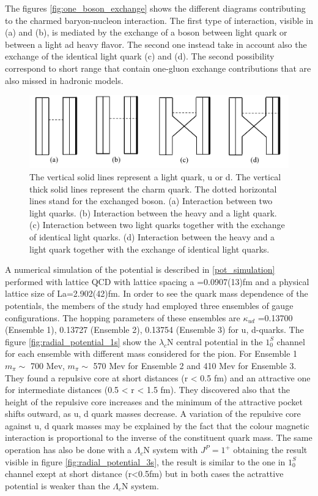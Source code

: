 \documentclass[12pt,a4paper]{book}
\begin{document}
	The figures \ref{fig:one_boson_exchange} shows the different diagrams contributing to the charmed baryon-nucleon interaction. The first type of interaction, visible in (a) and (b), is mediated by the exchange of a boson between light quark or between a light ad heavy flavor. The second one instead take in account also the exchange of the identical light quark (c) and (d). The second possibility correspond to short range that contain one-gluon exchange contributions that are also missed in hadronic models.
	
	\begin{figure}[ht]
		\centering
		\includegraphics[width=0.7\linewidth]{pictures/charmed_nucleos_interaction.png}
		\caption{ The vertical solid lines represent a light quark, u or d. The vertical thick solid lines represent the charm quark. The dotted horizontal lines stand for the exchanged boson. (a) Interaction between	two light quarks. (b) Interaction between the heavy and a light quark. (c) Interaction between	two light quarks together with the exchange of identical light quarks. (d) Interaction between the	heavy and a light quark together with the exchange of identical light quarks.}
		\label{fig:charmed_nucleos_interaction} 
	\end{figure}
	
	
	A numerical simulation of the potential is described in \ref{pot_simulation} performed with lattice QCD with lattice spacing a =0.0907(13)fm and a physical lattice size of La=2.902(42)fm. In order to see the quark mass dependence of the potentials, the members of the study had employed three ensembles of gauge configurations. The hopping parameters of these ensembles are $\kappa_{ud}$ =0.13700 (Ensemble 1), 0.13727 (Ensemble 2), 0.13754 (Ensemble 3) for u, d-quarks. The figure \ref{fig:radial_potential_1s} show the $\lambda_c$N central potential in the $1^S_0$ channel for each ensemble with different mass considered for the pion. For Ensemble 1 $m_\pi \sim$ 700 Mev, $m_\pi \sim$ 570 Mev for Ensemble 2 and 410 Mev for Ensemble 3. They found a repulsive core at short distances (r < 0.5 fm) and an attractive one for intermediate distances (0.5 < r < 1.5 fm). They discovered also that the height of the repulsive core increases and the minimum of the attractive pocket shifts outward, as u, d quark masses decrease. A variation of the repulsive core against u, d quark masses may be explained by the fact that the colour magnetic interaction is proportional to the inverse of the constituent quark mass. The same operation has also be done with a $\Lambda_c$N system with $J^P=1^+$ obtaining the result visible in figure \ref{fig:radial_potential_3s}, 
	the result is similar to the one in $1^S_0$ channel exept at short distance (r<0.5fm) but in both cases the actrattive potential is weaker than the $\Lambda_c$N system.
	
\end{document}
